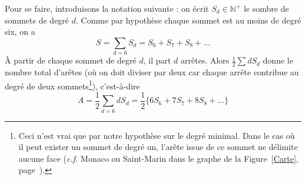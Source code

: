 \documentclass[french]{report}
\begin{document}
Pour se faire, introduisons la notation suivante :
on écrit $S_d\in\mathbb{N}^+$ le sombre de sommets de degré $d$. Comme par hypothèse chaque sommet est au moins de degré six, on a $$S=\sum\limits_{d=6}S_d=S_6+S_7+S_8+...$$ À partir de chaque sommet de degré $d$, il part $d$ arrêtes. Alors $\frac{1}{2}\sum dS_d$ donne le nombre total d'arêtes (où on doit diviser par deux car chaque arrête contribue au degré de deux sommets\footnote{Ceci n'est vrai que par notre hypothèse sur le degré minimal. Dans le cas où il peut exister un sommet de degré un, l'arête issue de ce sommet ne délimite aucune face (\textit{c.f.} Monaco ou Saint-Marin dans le graphe de la Figure~\ref{Carte}, page~\pageref{Carte}).}), c'est-à-dire $$A=\dfrac{1}{2}\sum\limits_{d=6}dS_d=\dfrac{1}{2}\Big\lbrace 6S_6+7S_7+8S_8+...\Big\rbrace$$
\end{document}
